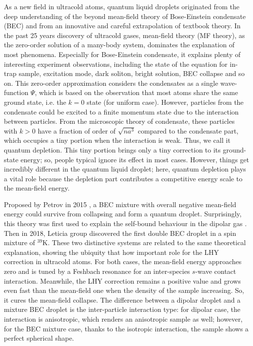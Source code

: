 As a new field in ultracold atoms, quantum liquid droplets originated from the deep understanding of the beyond mean-field theory of Bose-Einstein condensate (BEC) and from an innovative and careful extrapolation of textbook theory. In the past 25 years discovery of ultracold gases, mean-field theory (MF theory), as the zero-order solution of a many-body system, dominates the explanation of most phenomena. Especially for Bose-Einstein condensate, it explains plenty of interesting experiment observations, including the state of the equation for in-trap sample, excitation mode, dark soliton, bright solution, BEC collapse and so on. This zero-order approximation considers the condensates as a single wave-function \(\Psi\), which is based on the observation that most atoms share the same ground state, i.e. the \(k=0\) state (for uniform case). However, particles from the condensate could be excited to a finite momentum state due to the interaction between particles. From the microscopic theory of condensate, these particles with \(k>0\) have a fraction of order of \(\sqrt{na^3}\) compared to the condensate part, which occupies a tiny portion when the interaction is weak. Thus, we call it quantum depletion. This tiny portion brings only a tiny correction to its ground-state energy; so, people typical ignore its effect in most cases. However, things get incredibly different in the quantum liquid droplet; here, quantum depletion plays a vital role because the depletion part contributes a competitive energy scale to the mean-field energy. 

Proposed by Petrov in 2015 \cite{petrov2015}, a BEC mixture with overall negative mean-field energy could survive from collapsing and form a quantum droplet. Surprisingly, this theory was first used to explain the self-bound behaviour in the dipolar gas \cite{ferrier2016Liquid,chomaz2016}. Then in 2018, Leticia group \cite{cabrera2018quantum} discovered the first double BEC droplet in a spin mixture of \(^{39}\)K. These two distinctive systems are related to the same theoretical explanation, showing the ubiquity that how important role for the LHY correction in ultracold atoms. For both cases, the mean-field energy approaches zero and is tuned by a Feshbach resonance for an inter-species \(s\)-wave contact interaction. Meanwhile, the LHY correction remains a positive value and grows even fast than the mean-field one when the density of the sample increasing. So, it cures the mean-field collapse. The difference between a dipolar droplet and a mixture BEC droplet is the inter-particle interaction type: for dipolar case, the interaction is anisotropic, which renders an anisotropic sample as well; however, for the BEC mixture case, thanks to the isotropic interaction, the sample shows a perfect spherical shape.

